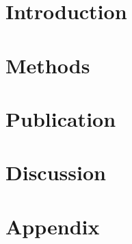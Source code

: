 \documentclass[11pt, titlepage, a4paper, twoside, onecolumn, DIV=calc]{scrbook} %
\begin{document}
\pagestyle{scrheadings} %



\tableofcontents %


\listoffigures %


\listoftables %



\clearpage


\mainmatter %


\pagestyle{raphimen}




\part{Introduction}

 

 
 
 
 
 
% 
% 

\part{Methods}




\part{Publication}
\renewcommand{\cftdot}{}







\part{Discussion}
\raggedright
 

\part{Appendix}
\setcounter{chapter}{8}

\end{document}
